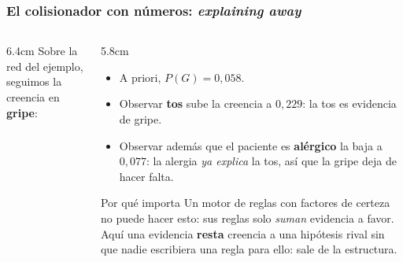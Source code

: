 \documentclass[aspectratio=169, 10pt]{beamer}
\begin{document}
\begin{frame}
\frametitle{El colisionador con números: \emph{explaining away}}
\begin{columns}[T]
\begin{column}{6.4cm}
Sobre la red del ejemplo, seguimos la creencia en \textbf{gripe}:
\vspace{0.3em}
\begin{center}
\end{center}
\end{column}
\begin{column}{5.8cm}
\footnotesize
\begin{itemize}
	\item A priori, $P(G)=0{,}058$.
	\item Observar \textbf{tos} sube la creencia a $0{,}229$: la tos es evidencia de gripe.
	\item Observar además que el paciente es \textbf{alérgico} la baja a $0{,}077$: la alergia \emph{ya explica} la tos, así que la gripe deja de hacer falta.
\end{itemize}
\vspace{0.3em}
\begin{block}{Por qué importa}
\footnotesize
Un motor de reglas con factores de certeza no puede hacer esto: sus reglas solo \emph{suman} evidencia a favor. Aquí una evidencia \textbf{resta} creencia a una hipótesis rival sin que nadie escribiera una regla para ello: sale de la estructura.
\end{block}
\end{column}
\end{columns}
\end{frame}
\end{document}
